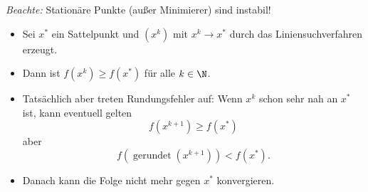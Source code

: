 \emph{Beachte:} Stationäre Punkte (außer Minimierer) sind instabil!
\begin{itemize}
 \item Sei $x^*$ ein Sattelpunkt und $(x^k )$ mit $x^k \to x^*$ durch das Liniensuchverfahren erzeugt.

 \item Dann ist $f(x^k) \geq f(x^*)$ für alle $k \in \N$.

 \item Tatsächlich aber treten Rundungsfehler auf: Wenn $x^k$ schon sehr nah an $x^*$ ist,
  kann eventuell gelten
  \begin{equation*}
   f (x^{k+1} ) \geq f (x^* )
  \end{equation*}
  aber
  \begin{equation*}
  f (\operatorname{gerundet}(x^{k+1}) ) < f(x^*).
  \end{equation*}
	\item Danach kann die Folge nicht mehr gegen $x^*$ konvergieren.
\end{itemize}
